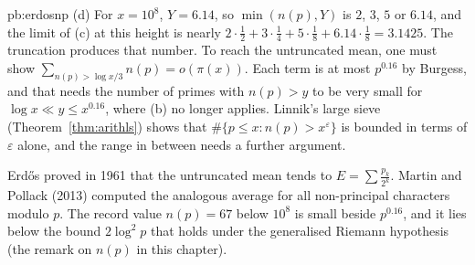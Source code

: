 \begin{solution}{pb:erdosnp}
(d) For $x=10^8$, $Y=6.14$, so $\min(n(p),Y)$ is $2$, $3$, $5$ or $6.14$, and the limit of (c) at this height is nearly $2\cdot\frac12+3\cdot\frac14+5\cdot\frac18+6.14\cdot\frac18=3.1425$. The truncation produces that number. To reach the untruncated mean, one must show $\sum_{n(p)>\log x/3}n(p)=o(\pi(x))$. Each term is at most $p^{0.16}$ by Burgess, and that needs the number of primes with $n(p)>y$ to be very small for $\log x\ll y\le x^{0.16}$, where (b) no longer applies. Linnik's large sieve (Theorem~\ref{thm:arithls}) shows that
$\#\{p\le x:n(p)>x^\varepsilon\}$ is bounded in terms of $\varepsilon$ alone, and the range in between needs a further argument.


\leads Erd\H os proved in 1961 that the untruncated mean tends to $E=\sum\frac{p_k}{2^k}$. Martin and Pollack (2013) computed the analogous average for all non-principal characters
modulo $p$. The record value $n(p)=67$ below $10^8$ is small beside $p^{0.16}$, and it lies below the bound $2\log^2p$ that holds under the generalised Riemann hypothesis
(the remark on $n(p)$ in this chapter).
\end{solution}

